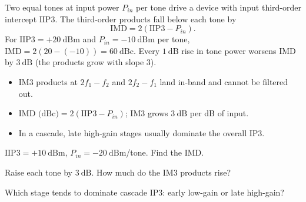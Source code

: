 \begin{workedexample}
Two equal tones at input power $P_{in}$ per tone drive a device with input
third-order intercept $\text{IIP3}$. The third-order products fall below each tone
by
\[ \text{IMD} = 2(\text{IIP3} - P_{in}). \]
For $\text{IIP3} = +20\ \text{dBm}$ and $P_{in} = -10\ \text{dBm}$ per tone,
$\text{IMD} = 2(20 - (-10)) = 60\ \text{dBc}$. Every $1\ \text{dB}$ rise in tone
power worsens IMD by $3\ \text{dB}$ (the products grow with slope 3).
\end{workedexample}

\begin{keytakeaways}
\begin{itemize}[leftmargin=1.4em,itemsep=2pt]
\item IM3 products at $2f_1 - f_2$ and $2f_2 - f_1$ land in-band and cannot be filtered out.
\item $\text{IMD (dBc)} = 2(\text{IIP3} - P_{in})$; IM3 grows $3\ \text{dB}$ per dB of input.
\item In a cascade, late high-gain stages usually dominate the overall IP3.
\end{itemize}
\end{keytakeaways}

\begin{exercises}
\item $\text{IIP3} = +10\ \text{dBm}$, $P_{in} = -20\ \text{dBm}$/tone. Find the IMD.
\item Raise each tone by $3\ \text{dB}$. How much do the IM3 products rise?
\item Which stage tends to dominate cascade IP3: early low-gain or late high-gain?
\end{exercises}

